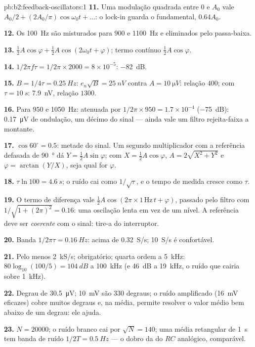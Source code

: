 \begin{solution}{pb:b2:feedback-oscillators:1}
\textbf{11.} Uma modulação quadrada entre $0$ e $A_0$ vale $A_0/2 + (2A_0/\pi)
\cos\omega_0t + \dots$: o lock-in guarda o fundamental, $0.64A_0$.

\textbf{12.} Os \qty{100}{Hz} são misturados para $900$ e \qty{1100}{Hz} e eliminados pelo
passa-baixa.

\textbf{13.} $\tfrac12A\cos\varphi + \tfrac12A\cos(2\omega_0t + \varphi)$; termo contínuo $\tfrac12A\cos\varphi$.

\textbf{14.} $1/2\pi f\tau = 1/2\pi \times 2000 = 8 \times 10^{-5}$: \qty{-82}{dB}.

\textbf{15.} $B = 1/4\tau = \qty{0.25}{Hz}$: $e_n\sqrt B = \qty{25}{nV}$ contra $A =
\qty{10}{\micro V}$: relação $400$; com $\tau = \qty{10}{s}$: \qty{7.9}{nV}, relação $1300$.

\textbf{16.} Para $950$ e \qty{1050}{Hz}: atenuada por $1/2\pi \times 950 = 1.7 \times
10^{-4}$ (\qty{-75}{dB}): \qty{0.17}{\micro V} de ondulação, um décimo do sinal ---
ainda vale um filtro rejeita-faixa a montante.

\textbf{17.} $\cos60^\circ = 0.5$: metade do sinal. Um segundo multiplicador com
a referência defasada de \qty{90}{\degree} dá $Y = \tfrac12A\sin\varphi$; com $X =
\tfrac12A\cos\varphi$, $A = 2\sqrt{X^2 + Y^2}$ e $\varphi = \arctan(Y/X)$, seja qual for $\varphi$.

\textbf{18.} $\tau\ln100 = \qty{4.6}{s}$; o ruído cai como $1/\sqrt\tau$, e o
tempo de medida cresce como $\tau$.

\textbf{19.} O termo de diferença vale $\tfrac12A\cos(2\pi \times 1\,\text{Hz}\,t + \varphi)$,
passado pelo filtro com $1/\sqrt{1 + (2\pi)^2} = 0.16$: uma oscilação
lenta em vez de um nível. A referência deve ser \emph{coerente}
com o sinal: tire-a do interruptor.

\textbf{20.} Banda $1/2\pi\tau = \qty{0.16}{Hz}$: acima de \qty{0.32}{S/s};
\qty{10}{S/s} é confortável.

\textbf{21.} Pelo menos \qty{2}{kS/s};  obrigatório; quarta ordem a \qty{5}{kHz}: $80\log_{10}(100/5) = \qty{104}{dB}$ a \qty{100}{kHz}
(e \qty{46}{dB} a \qty{19}{kHz}, o ruído que cairia sobre \qty{1}{kHz}).

\textbf{22.} Degrau de \qty{30.5}{\micro V}; \qty{10}{mV} são $330$ degraus; o ruído
amplificado (\qty{16}{mV} eficazes) cobre muitos degraus e, na média, permite resolver
o valor médio bem abaixo de um degrau: ele ajuda.

\textbf{23.} $N = 20000$; o ruído branco cai por $\sqrt N = 140$; uma
média retangular de \qty{1}{s} tem banda de ruído $1/2T = \qty{0.5}{Hz}$ --- o dobro da
do $RC$ analógico, comparável.


\end{solution}
